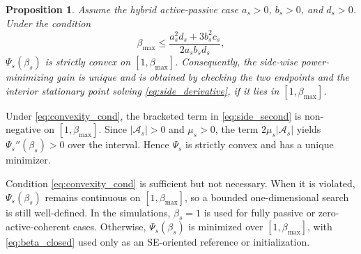 \documentclass[journal]{IEEEtran}
\newtheorem{proposition}{Proposition}
\begin{document}
\begin{proposition}\label{prop:convexity}
Assume the hybrid active-passive case $a_s>0$, $b_s>0$, and $d_s>0$. Under the condition
\begin{equation}
\beta_{\max}
\le
\frac{a_s^2d_s+3b_s^2c_s}{2a_sb_sd_s},
\label{eq:convexity_cond}
\end{equation}
$\Psi_s(\beta_s)$ is strictly convex on $[1,\beta_{\max}]$. Consequently, the side-wise power-minimizing gain is unique and is obtained by checking the two endpoints and the interior stationary point solving \eqref{eq:side_derivative}, if it lies in $[1,\beta_{\max}]$.
\end{proposition}

\begin{IEEEproof}
Under \eqref{eq:convexity_cond}, the bracketed term in \eqref{eq:side_second} is non-negative on $[1,\beta_{\max}]$. Since $|\mathcal{A}_s|>0$ and $\mu_s>0$, the term $2\mu_s|\mathcal{A}_s|$ yields $\Psi_s''(\beta_s)>0$ over the interval. Hence $\Psi_s$ is strictly convex and has a unique minimizer.
\end{IEEEproof}


Condition \eqref{eq:convexity_cond} is sufficient but not necessary. When it is violated, $\Psi_s(\beta_s)$ remains continuous on $[1,\beta_{\max}]$, so a bounded one-dimensional search is still well-defined. In the simulations, $\beta_s=1$ is used for fully passive or zero-active-coherent cases. Otherwise, $\Psi_s(\beta_s)$ is minimized over $[1,\beta_{\max}]$, with \eqref{eq:beta_closed} used only as an SE-oriented reference or initialization.
\end{document}
